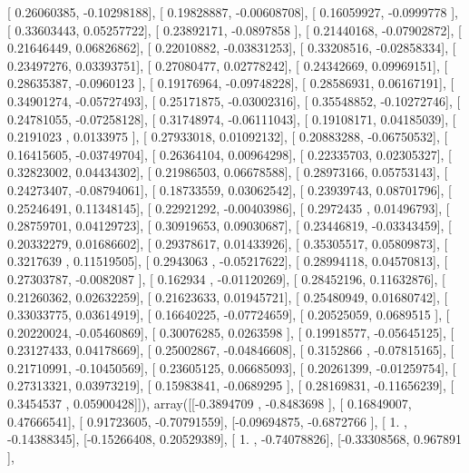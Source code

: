 \documentclass{article}
\begin{document}
       [ 0.26060385, -0.10298188],
       [ 0.19828887, -0.00608708],
       [ 0.16059927, -0.0999778 ],
       [ 0.33603443,  0.05257722],
       [ 0.23892171, -0.0897858 ],
       [ 0.21440168, -0.07902872],
       [ 0.21646449,  0.06826862],
       [ 0.22010882, -0.03831253],
       [ 0.33208516, -0.02858334],
       [ 0.23497276,  0.03393751],
       [ 0.27080477,  0.02778242],
       [ 0.24342669,  0.09969151],
       [ 0.28635387, -0.0960123 ],
       [ 0.19176964, -0.09748228],
       [ 0.28586931,  0.06167191],
       [ 0.34901274, -0.05727493],
       [ 0.25171875, -0.03002316],
       [ 0.35548852, -0.10272746],
       [ 0.24781055, -0.07258128],
       [ 0.31748974, -0.06111043],
       [ 0.19108171,  0.04185039],
       [ 0.2191023 ,  0.0133975 ],
       [ 0.27933018,  0.01092132],
       [ 0.20883288, -0.06750532],
       [ 0.16415605, -0.03749704],
       [ 0.26364104,  0.00964298],
       [ 0.22335703,  0.02305327],
       [ 0.32823002,  0.04434302],
       [ 0.21986503,  0.06678588],
       [ 0.28973166,  0.05753143],
       [ 0.24273407, -0.08794061],
       [ 0.18733559,  0.03062542],
       [ 0.23939743,  0.08701796],
       [ 0.25246491,  0.11348145],
       [ 0.22921292, -0.00403986],
       [ 0.2972435 ,  0.01496793],
       [ 0.28759701,  0.04129723],
       [ 0.30919653,  0.09030687],
       [ 0.23446819, -0.03343459],
       [ 0.20332279,  0.01686602],
       [ 0.29378617,  0.01433926],
       [ 0.35305517,  0.05809873],
       [ 0.3217639 ,  0.11519505],
       [ 0.2943063 , -0.05217622],
       [ 0.28994118,  0.04570813],
       [ 0.27303787, -0.0082087 ],
       [ 0.162934  , -0.01120269],
       [ 0.28452196,  0.11632876],
       [ 0.21260362,  0.02632259],
       [ 0.21623633,  0.01945721],
       [ 0.25480949,  0.01680742],
       [ 0.33033775,  0.03614919],
       [ 0.16640225, -0.07724659],
       [ 0.20525059,  0.0689515 ],
       [ 0.20220024, -0.05460869],
       [ 0.30076285,  0.0263598 ],
       [ 0.19918577, -0.05645125],
       [ 0.23127433,  0.04178669],
       [ 0.25002867, -0.04846608],
       [ 0.3152866 , -0.07815165],
       [ 0.21710991, -0.10450569],
       [ 0.23605125,  0.06685093],
       [ 0.20261399, -0.01259754],
       [ 0.27313321,  0.03973219],
       [ 0.15983841, -0.0689295 ],
       [ 0.28169831, -0.11656239],
       [ 0.3454537 ,  0.05900428]]), array([[-0.3894709 , -0.8483698 ],
       [ 0.16849007,  0.47666541],
       [ 0.91723605, -0.70791559],
       [-0.09694875, -0.6872766 ],
       [ 1.        , -0.14388345],
       [-0.15266408,  0.20529389],
       [ 1.        , -0.74078826],
       [-0.33308568,  0.967891  ],
\end{document}
